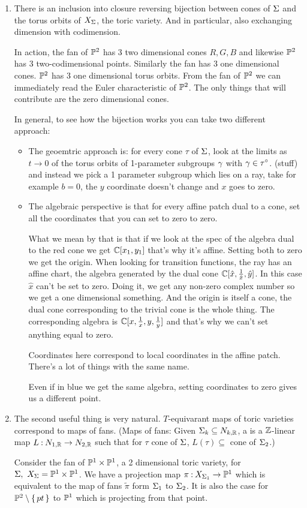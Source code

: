 \documentclass[12pt]{memoir}
\theoremstyle{definition}
\begin{document}
\begin{enumerate}
    \item There is an inclusion into closure reversing bijection between cones of $\Sigma$ and the torus orbits of $X_\Sigma$, the toric variety. And in particular, also exchanging dimension with codimension.\par 
    In action, the fan of $\mathbb{P}^2$ has 3 two dimensional cones $R,G,B$ and likewise $\mathbb{P}^2$ has 3 two-codimensional points. Similarly the fan has 3 one dimensional cones. $\mathbb{P}^2$ has 3 one dimensional torus orbits. From the fan of $\mathbb{P}^2$ we can immediately read the Euler characteristic of $\mathbb{P}^2$. The only things that will contribute are the zero dimensional cones.\par 
    In general, to see how the bijection works you can take two different approach:
    \begin{itemize}
        \item The geoemtric approach is: for every cone $\tau$ of $\Sigma$, look at the limits as $t\to 0$ of the torus orbits of 1-parameter subgroups $\gamma$ with $\gamma\in\tau^\circ$. (stuff) and instead we pick a 1 parameter subgroup which lies on a ray, take for example $b=0$, the $y$ coordinate doesn't change and $x$ goes to zero.
        \item The algebraic perspective is that for every affine patch dual to a cone, set all the coordinates that you can set to zero to zero. \par 
        What we mean by that is that if we look at the spec of the algebra dual to  the red cone we get $\mathbb{C}[x_1,y_1]$ that's why it's affine. Setting both to zero we get the origin. When looking for transition functions, the ray has an affine chart, the algebra generated by the dual cone $\mathbb{C}[\hat x,\frac{1}{\hat x},\hat y]$. In this case $\hat x$ can't be set to zero. Doing it, we get any non-zero complex number so we get a one dimensional something. And the origin is itself a cone, the dual cone corresponding to the trivial cone is the whole thing. The corresponding algebra is $\mathbb{C}[x,\frac1x,y,\frac1y]$ and that's why we can't set anything equal to zero.
        \begin{significant}
            Coordinates here correspond to local coordinates in the affine patch. There's a lot of things with the same name. 
        \end{significant}
        Even if in blue we get the same algebra, setting coordinates to zero gives us a different point.
    \end{itemize}
    \item The second useful thing is very natural. $T$-equivarant maps of toric varieties correspond to maps of fans. (Maps of fans: Given $\Sigma_k\subseteq N_{k,\mathbb{R}}$, a  is a $\mathbb{Z}$-linear map $L\mathbin{:} N_{1,\mathbb{R}}\to N_{2,\mathbb{R}}$ such that for $\tau$ cone of $\Sigma$, $L(\tau)\subseteq$ cone of $\Sigma_2$.)\par 
    Consider the fan of $\mathbb{P}^1\times\mathbb{P}^1$, a 2 dimensional toric variety, for $\Sg,\ X_\Sg=\bP^1\x\bP^1$. We have a projection map $\pi\mathbin{:} X_{\Sigma_1}\to\mathbb{P}^1$ which is equivalent to the map of fans $\tilde{\pi}$ form $\Sigma_1$ to $\Sigma_2$. It is also the case for $\mathbb{P}^2\setminus\{\,pt\,\}$ to $\mathbb{P}^1$ which is projecting from that point.
\end{enumerate}
\end{document}

